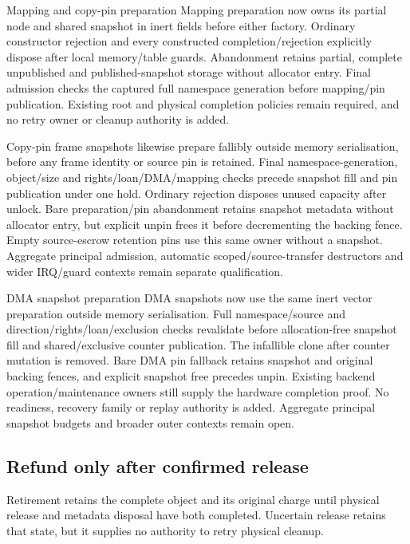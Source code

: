 \begin{implementationdetail}{Mapping and copy-pin preparation}
Mapping preparation now owns its partial node and shared snapshot in inert
fields before either factory. Ordinary constructor rejection and every
constructed completion/rejection explicitly dispose after local memory/table
guards. Abandonment retains partial, complete unpublished and published-snapshot
storage without allocator entry. Final admission checks the captured full
namespace generation before mapping/pin publication. Existing root and physical
completion policies remain required, and no retry owner or cleanup authority is added.

Copy-pin frame snapshots likewise prepare fallibly outside memory serialisation,
before any frame identity or source pin is retained. Final namespace-generation,
object/size and rights/loan/DMA/mapping checks precede snapshot fill and pin
publication under one hold. Ordinary rejection disposes unused capacity after
unlock. Bare preparation/pin abandonment retains snapshot metadata without
allocator entry, but explicit unpin frees it before decrementing the backing fence.
Empty source-escrow retention pins use this same owner without a snapshot.
Aggregate principal admission, automatic scoped/source-transfer destructors and
wider IRQ/guard contexts remain separate qualification.
\end{implementationdetail}

\begin{implementationdetail}{DMA snapshot preparation}
DMA snapshots now use the same inert vector preparation outside memory
serialisation. Full namespace/source and direction/rights/loan/exclusion checks
revalidate before allocation-free snapshot fill and shared/exclusive counter
publication. The infallible clone after counter mutation is removed. Bare DMA
pin fallback retains snapshot and original backing fences, and explicit snapshot
free precedes unpin. Existing backend operation/maintenance owners still supply
the hardware completion proof. No readiness, recovery family or replay authority
is added. Aggregate principal snapshot budgets and broader outer contexts remain open.
\end{implementationdetail}

\subsection{Refund only after confirmed release}

Retirement retains the complete object and its original charge until physical
release and metadata disposal have both completed. Uncertain release retains
that state, but it supplies no authority to retry physical cleanup.

